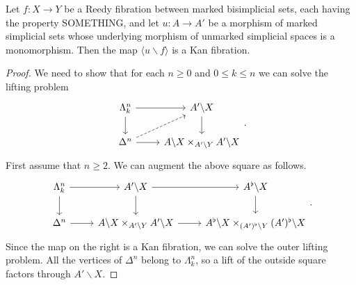 \documentclass[main.tex]{subfiles}
\begin{document}
\begin{proposition}
  \label{prop:cartesian_marking_has_SOMETHING_property}
  Let $f\colon X \to Y$ be a Reedy fibration between marked bisimplicial sets, each having the property SOMETHING, and let $u\colon A \to A'$ be a morphism of marked simplicial sets whose underlying morphism of unmarked simplicial spaces is a monomorphism. Then the map $\langle u \backslash f \rangle$ is a Kan fibration.
\end{proposition}
\begin{proof}
  We need to show that for each $n \geq 0$ and $0 \leq k \leq n$ we can solve the lifting problem
  \begin{equation*}
    \begin{tikzcd}
      \Lambda^{n}_{k}
      \arrow[r]
      \arrow[d]
      & A' \backslash X
      \arrow[d]
      \\
      \Delta^{n}
      \arrow[r]
      \arrow[ur, dashed]
      & A \backslash X \times_{A' \backslash Y} A' \backslash X
    \end{tikzcd}.
  \end{equation*}
  First assume that $n \geq 2$. We can augment the above square as follows.
  \begin{equation*}
    \begin{tikzcd}
      \Lambda^{n}_{k}
      \arrow[r]
      \arrow[d]
      & A' \backslash X
      \arrow[r]
      \arrow[d]
      & A^{\flat} \backslash X
      \arrow[d]
      \\
      \Delta^{n}
      \arrow[r]
      & A \backslash X \times_{A' \backslash Y} A' \backslash X
      \arrow[r]
      & A^{\flat} \backslash X \times_{(A')^{\flat} \backslash Y} (A')^{\flat} \backslash X
    \end{tikzcd}.
  \end{equation*}
  Since the map on the right is a Kan fibration, we can solve the outer lifting problem. All the vertices of $\Delta^{n}$ belong to $\Lambda^{n}_{k}$, so a lift of the outside square factors through $A' \backslash X$.


\end{proof}
\end{document}
